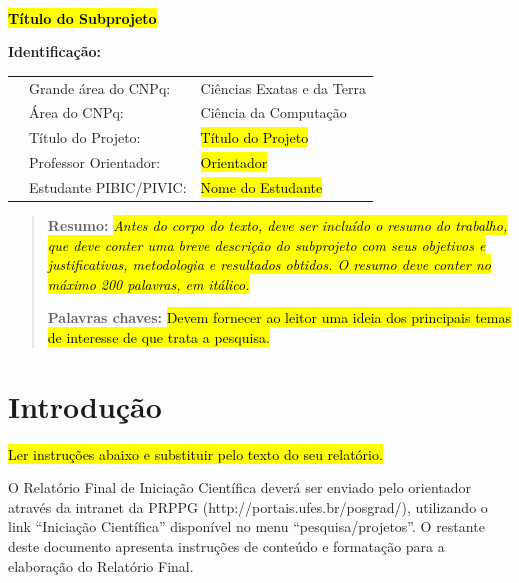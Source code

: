 \documentclass[10pt, a4paper]{article}
\begin{document}
\afterpage{\cfoot{\thepage}}
\ 
\vspace{1cm}

\begin{center}
	{\Large \bf \hl{Título do Subprojeto}}
\end{center}

\vspace{.5cm}

{\bf Identificação:}
\begin{tabular}{c l l}
	\phantom{cosmologia}&{Grande área do CNPq:} & Ciências Exatas e da Terra \\
	&{Área do CNPq:} &  Ciência da Computação \\
	&{Título do Projeto:} & \hl{Título do Projeto} \\
	&{Professor Orientador:} & \hl{Orientador} \\
	&{Estudante PIBIC/PIVIC:} & \hl{Nome do Estudante} 
\end{tabular}
\vspace{.5cm}

\begin{quote}
	{\bf Resumo:}
	\emph{\hl{Antes do corpo do texto, deve ser incluído o resumo do trabalho, que deve conter uma breve descrição do subprojeto com seus objetivos e justificativas, metodologia e resultados obtidos. O resumo deve conter no máximo 200 palavras, em itálico.}}
	
	{\bf Palavras chaves:} \hl{Devem fornecer ao leitor uma ideia dos principais temas de interesse de que trata a pesquisa.}
\end{quote}

	
	
\section{Introdução}
\label{sec-intro}

\hl{Ler instruções abaixo e substituir pelo texto do seu relatório.}

O Relatório Final de Iniciação Científica deverá ser enviado pelo orientador através da intranet da PRPPG (http://portais.ufes.br/posgrad/), utilizando o link “Iniciação Científica” disponível no menu “pesquisa/projetos”. O restante deste documento apresenta instruções de conteúdo e formatação para a elaboração do Relatório Final.
\end{document}

